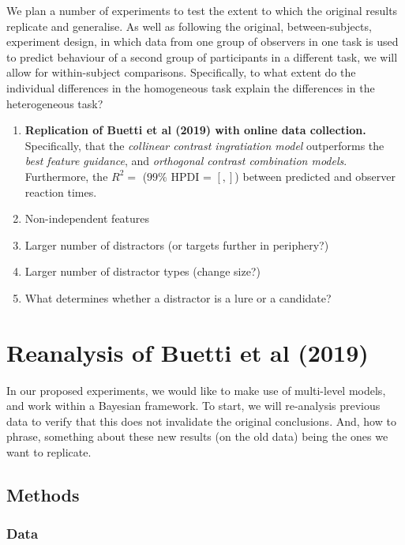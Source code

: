 We plan a number of experiments to test the extent to which the original results replicate and generalise. As well as following the original, between-subjects, experiment design, in which data from one group of observers in one task is used to predict behaviour of a second group of participants in a different task, we will allow for within-subject comparisons. Specifically, to what extent do the individual differences in the homogeneous task explain the differences in the heterogeneous task? 

\begin{enumerate}
\item \textbf{Replication of Buetti et al (2019) with online data collection.} Specifically, that the \textit{collinear contrast ingratiation model} outperforms the \textit{best feature guidance}, and \textit{orthogonal contrast combination models}.  Furthermore, the $R^2 = $ ($99\%$ HPDI = $[, ]$) between predicted and observer reaction times.\\
\item Non-independent features \\
\item Larger number of distractors (or targets further in periphery?) \\ 
\item Larger number of distractor types (change size?) \\ 
\item What determines whether a distractor is a lure or a candidate? \\
\end{enumerate}

\section{Reanalysis of Buetti et al (2019)}

In our proposed experiments, we would like to make use of multi-level models, and work within a Bayesian framework. To start, we will re-analysis previous data to verify that this does not invalidate the original conclusions. And, how to phrase, something about these new results (on the old data) being the ones we want to replicate. 

\subsection{Methods}

\subsubsection{Data}

